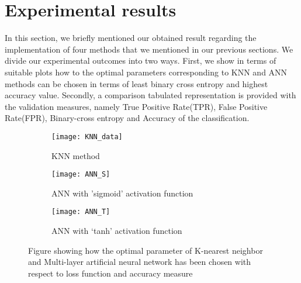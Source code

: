 \documentclass{llncs}
\begin{document}
\section{Experimental results}
\vspace{-1cm}
In this section, we briefly mentioned our obtained result regarding the implementation of four methods that we mentioned in our previous sections. We divide our experimental outcomes into two ways. First, we show in terms of suitable plots how to the optimal parameters corresponding to KNN and ANN methods can be chosen in terms of least binary cross entropy and highest accuracy value. Secondly, a comparison tabulated representation is provided with the validation measures, namely True Positive Rate(TPR), False Positive Rate(FPR), Binary-cross entropy and Accuracy of the classification. 
\begin{figure}[h] 
\begin{subfigure}{.6\textwidth}
  \centering
  \texttt{[image: KNN\_data]}
  \captionsetup{font=scriptsize}
  \caption{KNN method }
  \label{fig:sfig1}
\end{subfigure}%
\begin{subfigure}{.6\textwidth}
  \centering
  \texttt{[image: ANN\_S]}
  \captionsetup{font=scriptsize}
  \caption{ANN with 'sigmoid' activation function}
  \label{fig:sfig2}
\end{subfigure}
\begin{subfigure}{.6\textwidth}
  \centering
  \texttt{[image: ANN\_T]}
  \captionsetup{font=scriptsize}
  \caption{ANN with `tanh' activation function}
  \label{fig:sfig3}
\end{subfigure}
\caption{Figure showing how the optimal parameter of K-nearest neighbor and Multi-layer artificial neural network has been chosen with respect to loss function and accuracy measure}
 \label{fig:fig1}
\end{figure}
\end{document}
